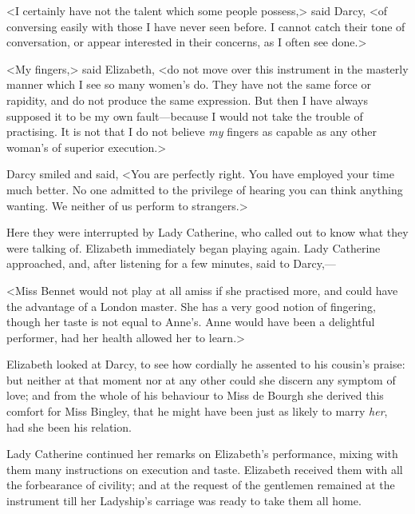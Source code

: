 <I certainly have not the talent which some people possess,> said Darcy, <of conversing easily with those I have never seen before. I cannot catch their tone of conversation, or appear interested in their concerns, as I often see done.>

<My fingers,> said Elizabeth, <do not move over this instrument in the masterly manner which I see so many women's do. They have not the same force or rapidity, and do not produce the same expression. But then I have always supposed it to be my own fault—because I would not take the trouble of practising. It is not that I do not believe \textit{my} fingers as capable as any other woman's of superior execution.>

Darcy smiled and said, <You are perfectly right. You have employed your time much better. No one admitted to the privilege of hearing you can think anything wanting. We neither of us perform to strangers.>

Here they were interrupted by Lady Catherine, who called out to know what they were talking of. Elizabeth immediately began playing again. Lady Catherine approached, and, after listening for a few minutes, said to Darcy,—

<Miss Bennet would not play at all amiss if she practised more, and could have the advantage of a London master. She has a very good notion of fingering, though her taste is not equal to Anne's. Anne would have been a delightful performer, had her health allowed her to learn.>

Elizabeth looked at Darcy, to see how cordially he assented to his cousin's praise: but neither at that moment nor at any other could she discern any symptom of love; and from the whole of his behaviour to Miss de Bourgh she derived this comfort for Miss Bingley, that he might have been just as likely to marry \textit{her}, had she been his relation.

Lady Catherine continued her remarks on Elizabeth's performance, mixing with them many instructions on execution and taste. Elizabeth received them with all the forbearance of civility; and at the request of the gentlemen remained at the instrument till her Ladyship's carriage was ready to take them all home.
